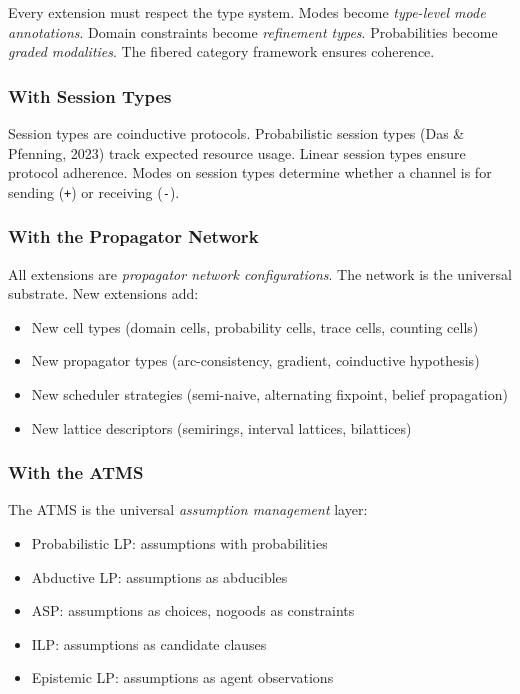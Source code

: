 \documentclass[11pt]{article}
\begin{document}
Every extension must respect the type system. Modes become \emph{type-level mode
annotations}. Domain constraints become \emph{refinement types}. Probabilities
become \emph{graded modalities}. The fibered category framework ensures coherence.
\subsubsection{With Session Types}
\label{sec:orgda63157}

Session types are coinductive protocols. Probabilistic session types (Das \&
Pfenning, 2023) track expected resource usage. Linear session types ensure
protocol adherence. Modes on session types determine whether a channel is
for sending (\texttt{+}) or receiving (\texttt{-}).
\subsubsection{With the Propagator Network}
\label{sec:org9c64dad}

All extensions are \emph{propagator network configurations}. The network is the
universal substrate. New extensions add:
\begin{itemize}
\item New cell types (domain cells, probability cells, trace cells, counting cells)
\item New propagator types (arc-consistency, gradient, coinductive hypothesis)
\item New scheduler strategies (semi-naive, alternating fixpoint, belief propagation)
\item New lattice descriptors (semirings, interval lattices, bilattices)
\end{itemize}
\subsubsection{With the ATMS}
\label{sec:org692254c}

The ATMS is the universal \emph{assumption management} layer:
\begin{itemize}
\item Probabilistic LP: assumptions with probabilities
\item Abductive LP: assumptions as abducibles
\item ASP: assumptions as choices, nogoods as constraints
\item ILP: assumptions as candidate clauses
\item Epistemic LP: assumptions as agent observations
\end{itemize}
\end{document}
